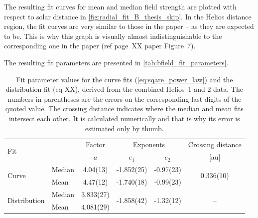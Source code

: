 The resulting fit curves for mean and median field strength are plotted with respect to solar distance in \autoref{fig:radial_fit_B_thesis_skip}. In the Helios distance region, the fit curves are very similar to those in the paper -- as they are expected to be. This is why this graph is visually almost indistinguishable to the corresponding one in the paper (ref page~XX paper Figure~7).
\begin{figure}[htb]
\end{figure}
The resulting fit parameters are presented in \autoref{tab:bfield_fit_parameters}.\\
\begin{table}
	\caption{Fit parameter values for the curve fits (\autoref{eq:sqare_power_law}) and the distribution fit (eq XX), derived from the combined Helios~1 and 2 data. The numbers in parentheses are the errors on the corresponding last digits of the quoted value. The crossing distance indicates where the median and mean fits intersect each other. It is calculated numerically and that is why its error is estimated only by thumb.}
	\label{tab:bfield_fit_parameters}
	\centering
	\begin{tabular}{l l c c c c}
		\hline\hline
		\multirow{2}{*}{Fit}	&	&Factor	&\multicolumn{2}{c}{Exponents}	&Crossing distance\\
		\cline{4-5}
			&	&$a$	&$e_1$	&$e_2$	&[au]\\
		\hline
		\multirow{2}{*}{Curve}	&Median	&4.04(13)	&-1.852(25)	&-0.97(23)	&\multirow{2}{*}{0.336(10)}\\
			&Mean	&4.47(12)	&-1.740(18)	&-0.99(23)	&\\
		\multirow{2}{*}{Distribution}	&Median	&3.833(27)	&\multirow{2}{*}{-1.858(42)}	&\multirow{2}{*}{-1.32(12)}	&\multirow{2}{*}{--}\\
			&Mean	&4.081(29)	&	&	&\\
		\hline
	\end{tabular}
\end{table}
